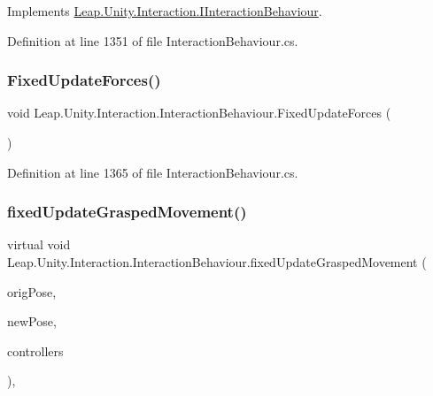 Implements \mbox{\hyperlink{interface_leap_1_1_unity_1_1_interaction_1_1_i_interaction_behaviour_a7be9c13a479bebdd78fbfcdd67a2304f}{Leap.\+Unity.\+Interaction.\+I\+Interaction\+Behaviour}}.



Definition at line 1351 of file Interaction\+Behaviour.\+cs.

\mbox{\label{class_leap_1_1_unity_1_1_interaction_1_1_interaction_behaviour_aa6c35ef7558084f29e77ebe9e0088d85}} 
\subsubsection{\texorpdfstring{FixedUpdateForces()}{FixedUpdateForces()}}
{\footnotesize\ttfamily void Leap.\+Unity.\+Interaction.\+Interaction\+Behaviour.\+Fixed\+Update\+Forces (\begin{DoxyParamCaption}{ }\end{DoxyParamCaption})}



Definition at line 1365 of file Interaction\+Behaviour.\+cs.

\mbox{\label{class_leap_1_1_unity_1_1_interaction_1_1_interaction_behaviour_a55d343326d23259bd514650de4b608c0}} 
\subsubsection{\texorpdfstring{fixedUpdateGraspedMovement()}{fixedUpdateGraspedMovement()}}
{\footnotesize\ttfamily virtual void Leap.\+Unity.\+Interaction.\+Interaction\+Behaviour.\+fixed\+Update\+Grasped\+Movement (\begin{DoxyParamCaption}\item[{\mbox{\hyperlink{struct_leap_1_1_unity_1_1_pose}{Pose}}}]{orig\+Pose,  }\item[{\mbox{\hyperlink{struct_leap_1_1_unity_1_1_pose}{Pose}}}]{new\+Pose,  }\item[{List$<$ \mbox{\hyperlink{class_leap_1_1_unity_1_1_interaction_1_1_interaction_controller}{Interaction\+Controller}} $>$}]{controllers }\end{DoxyParamCaption})\hspace{0.3cm}{\ttfamily [protected]}, {\ttfamily [virtual]}}



